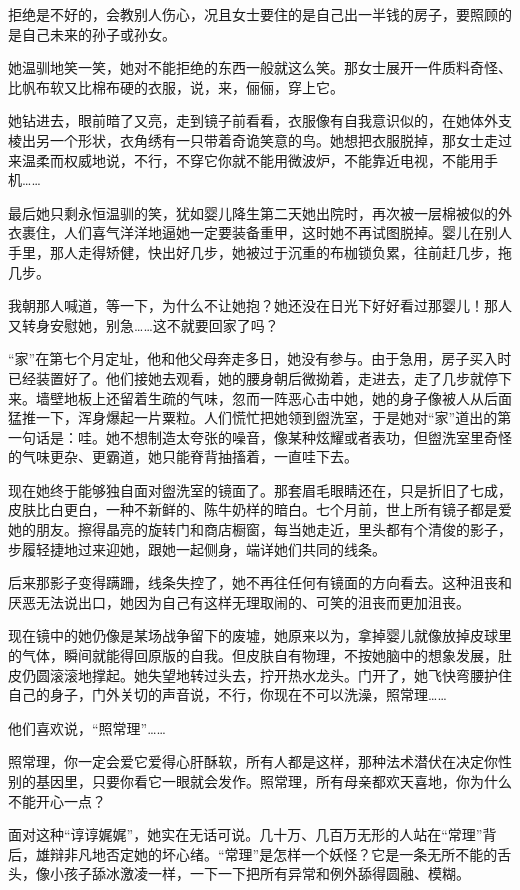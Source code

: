 \documentclass[lang=cn,newtx,12pt,scheme=chinese]{elegantbook}
\begin{document}
拒绝是不好的，会教别人伤心，况且女士要住的是自己出一半钱的房子，要照顾的是自己未来的孙子或孙女。

她温驯地笑一笑，她对不能拒绝的东西一般就这么笑。那女士展开一件质料奇怪、比帆布软又比棉布硬的衣服，说，来，俪俪，穿上它。

她钻进去，眼前暗了又亮，走到镜子前看看，衣服像有自我意识似的，在她体外支棱出另一个形状，衣角绣有一只带着奇诡笑意的鸟。她想把衣服脱掉，那女士走过来温柔而权威地说，不行，不穿它你就不能用微波炉，不能靠近电视，不能用手机……

最后她只剩永恒温驯的笑，犹如婴儿降生第二天她出院时，再次被一层棉被似的外衣裹住，人们喜气洋洋地逼她一定要装备重甲，这时她不再试图脱掉。婴儿在别人手里，那人走得矫健，快出好几步，她被过于沉重的布枷锁负累，往前赶几步，拖几步。

我朝那人喊道，等一下，为什么不让她抱？她还没在日光下好好看过那婴儿！那人又转身安慰她，别急……这不就要回家了吗？

“家”在第七个月定址，他和他父母奔走多日，她没有参与。由于急用，房子买入时已经装置好了。他们接她去观看，她的腰身朝后微拗着，走进去，走了几步就停下来。墙壁地板上还留着生疏的气味，忽而一阵恶心击中她，她的身子像被人从后面猛推一下，浑身爆起一片粟粒。人们慌忙把她领到盥洗室，于是她对“家”道出的第一句话是：哇。她不想制造太夸张的噪音，像某种炫耀或者表功，但盥洗室里奇怪的气味更杂、更霸道，她只能脊背抽搐着，一直哇下去。

现在她终于能够独自面对盥洗室的镜面了。那套眉毛眼睛还在，只是折旧了七成，皮肤比白更白，一种不新鲜的、陈牛奶样的暗白。七个月前，世上所有镜子都是爱她的朋友。擦得晶亮的旋转门和商店橱窗，每当她走近，里头都有个清俊的影子，步履轻捷地过来迎她，跟她一起侧身，端详她们共同的线条。

后来那影子变得蹒跚，线条失控了，她不再往任何有镜面的方向看去。这种沮丧和厌恶无法说出口，她因为自己有这样无理取闹的、可笑的沮丧而更加沮丧。

现在镜中的她仍像是某场战争留下的废墟，她原来以为，拿掉婴儿就像放掉皮球里的气体，瞬间就能得回原版的自我。但皮肤自有物理，不按她脑中的想象发展，肚皮仍圆滚滚地撑起。她失望地转过头去，拧开热水龙头。门开了，她飞快弯腰护住自己的身子，门外关切的声音说，不行，你现在不可以洗澡，照常理……

他们喜欢说，“照常理”……

照常理，你一定会爱它爱得心肝酥软，所有人都是这样，那种法术潜伏在决定你性别的基因里，只要你看它一眼就会发作。照常理，所有母亲都欢天喜地，你为什么不能开心一点？

面对这种“谆谆娓娓”，她实在无话可说。几十万、几百万无形的人站在“常理”背后，雄辩非凡地否定她的坏心绪。“常理”是怎样一个妖怪？它是一条无所不能的舌头，像小孩子舔冰激凌一样，一下一下把所有异常和例外舔得圆融、模糊。
\end{document}
